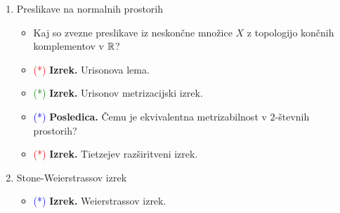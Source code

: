 \begin{enumerate}
    \item Preslikave na normalnih prostorih
    \begin{itemize}
        \item Kaj so zvezne preslikave iz neskončne množice \(X\) z topologijo končnih komplementov v \(\mathbb{R}\)?
        \item \textcolor{red}{(*)} \textbf{Izrek.} Urisonova lema.
        \item \textcolor{green}{(*)} \textbf{Izrek.} Urisonov metrizacijski izrek.
        \item \textcolor{blue}{(*)} \textbf{Posledica.} Čemu je ekvivalentna metrizabilnost v \(2\)-števnih prostorih?
        \item \textcolor{red}{(*)} \textbf{Izrek.} Tietzejev razširitveni izrek.
    \end{itemize}

    \item Stone-Weierstrassov izrek
    \begin{itemize}
        \item \textcolor{blue}{(*)} \textbf{Izrek.} Weierstrassov izrek.
    \end{itemize}
\end{enumerate}